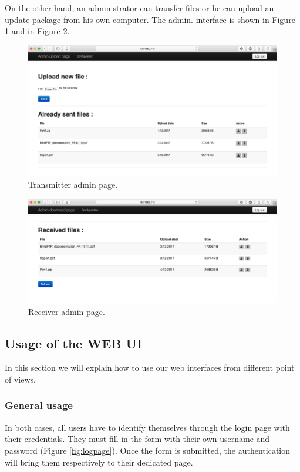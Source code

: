 \documentclass[a4paper,10pt]{article}
\begin{document}
On the other hand, an administrator can transfer files or he can upload an update package from his own computer. The admin. interface is shown in Figure \ref{fig:transadminpage}
and in Figure \ref{fig:receiveradminpage}.
\begin{figure}[!h]
\centering
\includegraphics[scale=0.35]{images/admintransmitter.png}
\caption{Transmitter admin page.}
\label{fig:transadminpage}
\end{figure}

\begin{figure}[!h]
\centering
\includegraphics[scale=0.35]{images/adminreceiver.png}
\caption{Receiver admin page.}
\label{fig:receiveradminpage}
\end{figure}
\clearpage
\subsection{Usage of the WEB UI}
In this section we will explain how to use our web interfaces from different point of views.
\subsubsection{General usage}
In both cases, all users have to identify themselves through the login page with their credentials. They must fill in the form with their own username and password (Figure \ref{fig:logpage}). Once the form is submitted, the authentication will bring them respectively to their dedicated page.\bigskip 
\end{document}
